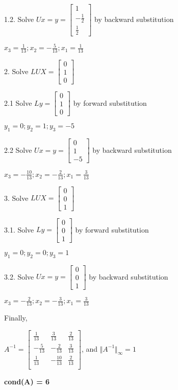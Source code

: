 \documentclass[12pt]{article}
\newenvironment{exercise}[2][Exercise]{\begin{trivlist}
\item[\hskip \labelsep {\bfseries #1}\hskip \labelsep {\bfseries #2.}]}{\end{trivlist}}
\begin{document}
\begin{exercise}{5}
1.2. Solve $Ux=y=\begin{bmatrix} 1\\-\frac{1}{2}\\\frac{1}{2}\end{bmatrix}$
by backward substitution
\begin{center}
$x_3=\frac{1}{13};x_2=-\frac{5}{13};x_1=\frac{1}{13}$
\end{center}

2. Solve $LUX=\begin{bmatrix} 0\\1\\0\end{bmatrix}$

2.1 Solve $Ly=\begin{bmatrix} 0\\1\\0\end{bmatrix}$ by forward substitution
\begin{center}
$y_1 = 0; y_2=1;y_3=-5$
\end{center}

2.2 Solve $Ux=y=\begin{bmatrix} 0\\1\\-5\end{bmatrix}$ by backward substitution
\begin{center}
$x_3=-\frac{10}{13};x_2=-\frac{2}{13};x_1=\frac{3}{13}$
\end{center}

3. Solve $LUX=\begin{bmatrix} 0\\0\\1\end{bmatrix}$

3.1. Solve $Ly=\begin{bmatrix} 0\\0\\1\end{bmatrix}$ by forward substitution
\begin{center}
$y_1 = 0; y_2=0;y_3=1$
\end{center}

3.2. Solve $Ux=y=\begin{bmatrix} 0\\0\\1\end{bmatrix}$ by backward substitution
\begin{center}
$x_3=-\frac{2}{13};x_2=-\frac{3}{13};x_1=\frac{3}{13}$
\end{center}

Finally,
\begin{center}
$A^{-1} = \begin{bmatrix}
\frac{1}{13}&\frac{3}{13}&\frac{2}{13}\\
-\frac{5}{13}&-\frac{2}{13}&\frac{3}{13}\\
\frac{1}{13}&-\frac{10}{13}&\frac{2}{13}\\
\end{bmatrix}
$, and $\Vert A^{-1} \Vert _\infty = 1$ \\
\end{center}

\textbf{cond(A) = 6}
\end{exercise}
\end{document}
